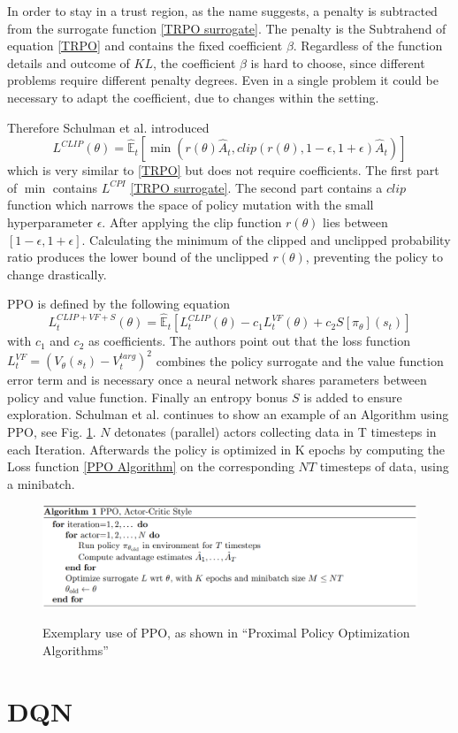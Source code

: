 In order to stay in a trust region, as the name suggests, a penalty is subtracted from the
surrogate function \eqref{TRPO surrogate}.
The penalty is the Subtrahend of equation \eqref{TRPO} and contains the fixed coefficient $\beta$.
Regardless of the function details and outcome of $KL$, the coefficient $\beta$
is hard to choose, since different problems require different penalty degrees. Even in a single problem
it could be necessary to adapt the coefficient, due to changes within the setting.

Therefore Schulman et al. introduced
\begin{equation}\label{PPO}
    L^{CLIP}(\theta) = \hat{\mathbb{E}}_{t}[\min(r(\theta)\hat{A}_{t},clip(r(\theta), 1-\epsilon, 1+\epsilon)\hat{A}_{t})]
\end{equation}
which is very similar to \eqref{TRPO} but does not require coefficients.
The first part of $\min$ contains $L^{CPI}$ \eqref{TRPO surrogate}.
The second part contains a $clip$ function which narrows the space of policy mutation with
the small hyperparameter $\epsilon$. After applying the clip function $r(\theta)$ lies between
$[1-\epsilon,1+\epsilon]$. Calculating the minimum of the clipped and unclipped probability ratio
produces the lower bound of the unclipped $r(\theta)$, preventing the policy to change drastically.

PPO is defined by the following equation
\begin{equation}\label{PPO Algorithm}
    L_{t}^{CLIP+VF+S}(\theta) = \hat{\mathbb{E}}_{t}[L_{t}^{CLIP}(\theta) - c_{1}L_{t}^{VF}(\theta) + c_{2}S[\pi_{\theta}](s_{t})]
\end{equation}
with $c_{1}$ and $c_{2}$ as coefficients. The authors point out that the loss function \\
$L_{t}^{VF} = (V_{\theta}(s_{t})-V_{t}^{targ})^2$
combines the policy surrogate and the value function error term and is
necessary once a neural network shares parameters between policy and value function.
Finally an entropy bonus $S$ is added to ensure exploration.
Schulman et al. continues to show an example of an Algorithm using PPO, see Fig. \ref{fig:ppo_algo_code}.
$N$ detonates (parallel) actors collecting data in T timesteps in each Iteration.
Afterwards the policy is optimized in K epochs by computing the Loss function \eqref{PPO Algorithm} on the
corresponding $NT$ timesteps of data, using a minibatch.
\begin{figure}[hpbt]
    \centering
    \includegraphics[width=1\textwidth]{pictures/ppo_algo_code.png}\\
    \caption[Exemplary use of PPO]{Exemplary use of PPO, as shown in ``Proximal Policy Optimization Algorithms''\cite{scwo2017}}\label{fig:ppo_algo_code}
\end{figure}

\section{DQN}